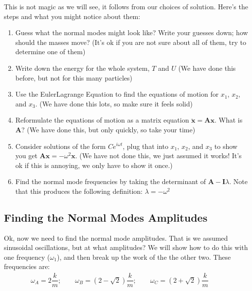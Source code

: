 \documentclass[letterpaper,10pt,english]{jupyterBook}
\begin{document}
\sphinxAtStartPar
This is not magic as we will see, it follows from our choices of solution. Here’s the steps and what you might notice about them:
\begin{enumerate}
%
\item {} 
\sphinxAtStartPar
Guess what the normal modes might look like? Write your guesses down; how should the masses move? (It’s ok if you are not sure about all of them, try to determine one of them)

\item {} 
\sphinxAtStartPar
Write down the energy for the whole system, \(T\) and \(U\) (We have done this before, but not for this many particles)

\item {} 
\sphinxAtStartPar
Use the Euler\sphinxhyphen{}Lagrange Equation to find the equations of motion for \(x_1\), \(x_2\), and \(x_3\). (We have done this lots, so make sure it feels solid)

\item {} 
\sphinxAtStartPar
Reformulate the equations of motion as a matrix equation \(\ddot{\mathbf{x}} = \mathbf{A} \mathbf{x}\). What is \(\mathbf{A}\)? (We have done this, but only quickly, so take your time)

\item {} 
\sphinxAtStartPar
Consider solutions of the form \(Ce^{i{\omega}t}\), plug that into \(x_1\), \(x_2\), and \(x_3\) to show you get \(\mathbf{A}\mathbf{x} = -\omega^2 \mathbf{x}\). (We have not done this, we just assumed it works! It’s ok if this is annoying, we only have to show it once.)

\item {} 
\sphinxAtStartPar
Find the normal mode frequencies by taking the determinant of \(\mathbf{A} - \mathbf{I}\lambda\). Note that this produces the following definition: \(\lambda = -\omega^2\)

\end{enumerate}


\subsection{Finding the Normal Modes Amplitudes}
\label{\detokenize{content/3_waves/normal_modes:finding-the-normal-modes-amplitudes}}
\sphinxAtStartPar
Ok, now we need to find the normal mode amplitudes. That is we assumed sinusoidal oscillations, but at what amplitudes? We will show how to do this with one frequency (\(\omega_1\)), and then break up the work of the the other two. These frequencies are:
\begin{equation*}
\begin{split}\omega_A = 2\dfrac{k}{m}; \qquad \omega_B = \left(2-\sqrt{2}\right)\dfrac{k}{m}; \qquad \omega_C = \left(2+\sqrt{2}\right)\dfrac{k}{m}\qquad\end{split}
\end{equation*}
\sphinxAtStartPar
{}
\end{document}
